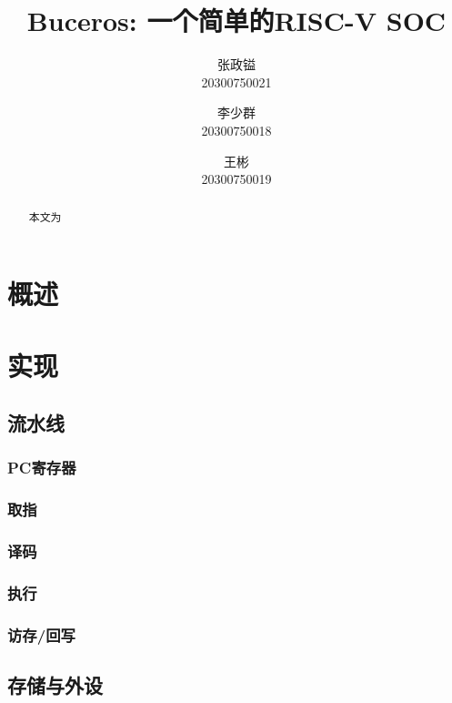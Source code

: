 \documentclass[lang=cn,11pt,a4paper,chinesefont=founder]{elegantpaper}
\title{Buceros: 一个简单的RISC-V SOC}
\author{张政镒 \\ 20300750021 \and 李少群 \\ 20300750018 \and 王彬 \\ 20300750019}
\institute{\href{https://github.com/0xtaruhi/Buceros}{Github项目链接}}
\date{\zhtoday}
\begin{document}
\maketitle

\begin{abstract}
    本文为
\end{abstract}

\section{概述}

\section{实现}
\subsection{流水线}
\subsubsection{PC寄存器}

\subsubsection{取指}

\subsubsection{译码}

\subsubsection{执行}

\subsubsection{访存/回写}

\subsection{存储与外设}
\end{document}
